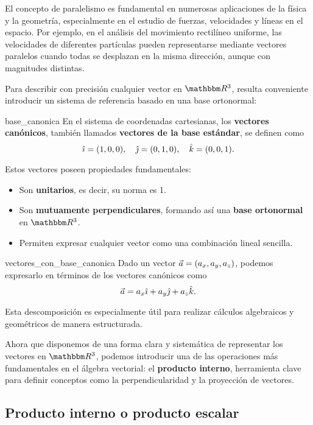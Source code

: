 El concepto de paralelismo es fundamental en numerosas aplicaciones de la física y la geometría, especialmente en el estudio de fuerzas, velocidades y líneas en el espacio. Por ejemplo, en el análisis del movimiento rectilíneo uniforme, las velocidades de diferentes partículas pueden representarse mediante vectores paralelos cuando todas se desplazan en la misma dirección, aunque con magnitudes distintas.

Para describir con precisión cualquier vector en $\RR[3]$, resulta conveniente introducir un sistema de referencia basado en una base ortonormal:

\begin{definition}{}{base_canonica}
    En el sistema de coordenadas cartesianas, los \textbf{vectores canónicos}, también llamados \textbf{vectores de la base estándar}, se definen como
    $$\hat{\imath} = (1,0,0), \quad \hat{\jmath} = (0,1,0), \quad \hat{k} = (0,0,1).$$
\end{definition}

Estos vectores poseen propiedades fundamentales:

\begin{itemize}
    \item Son \textbf{unitarios}, es decir, su norma es 1.
    \item Son \textbf{mutuamente perpendiculares}, formando así una \textbf{base ortonormal} en $\RR[3]$.
    \item Permiten expresar cualquier vector como una combinación lineal sencilla.
\end{itemize}

\begin{definition}{}{vectores_con_base_canonica}
    Dado un vector $\vec{a} = (a_x, a_y, a_z)$, podemos expresarlo en términos de los vectores canónicos como
    $$\vec{a} = a_x\hat{\imath} + a_y\hat{\jmath} + a_z\hat{k}.$$
\end{definition}

Esta descomposición es especialmente útil para realizar cálculos algebraicos y geométricos de manera estructurada.

Ahora que disponemos de una forma clara y sistemática de representar los vectores en $\RR[3]$, podemos introducir una de las operaciones más fundamentales en el álgebra vectorial: el \textbf{producto interno}, herramienta clave para definir conceptos como la perpendicularidad y la proyección de vectores.

\subsection{Producto interno o producto escalar}

